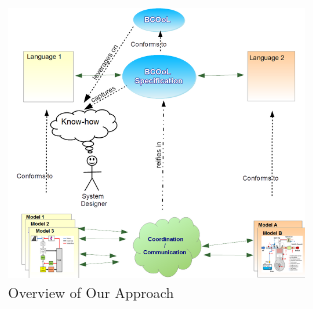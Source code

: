          	\begin{figure}
         		\begin{center}
         			\includegraphics[width=0.7\textwidth]{background/figs/bcoolapp.png}
         			\caption{Overview of Our Approach}
         			\label{fig:diNatale}
         		\end{center}
         	\end{figure}	

